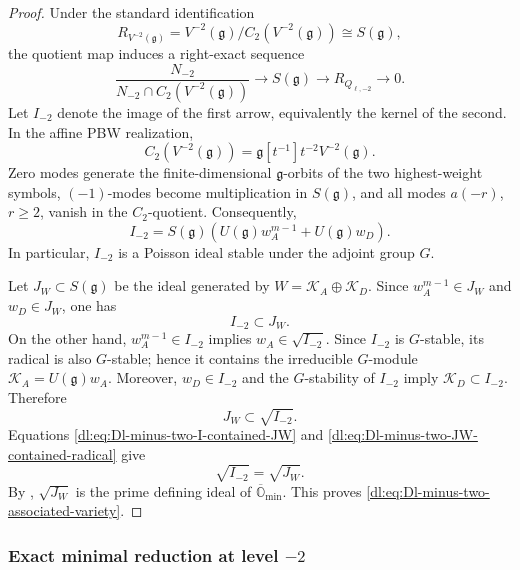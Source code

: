 \documentclass[11pt,reqno]{amsart}
\theoremstyle{definition}
\theoremstyle{remark}
\begin{document}
\begin{proof}
Under the standard identification
\[
  R_{V^{-2}(\mathfrak g)}
  =
  V^{-2}(\mathfrak g)/C_2(V^{-2}(\mathfrak g))
  \cong S(\mathfrak g),
\]
the quotient map induces a right-exact sequence
\begin{equation*}
  \frac{N_{-2}}
  {N_{-2}\cap C_2(V^{-2}(\mathfrak g))}
  \longrightarrow
  S(\mathfrak g)
  \longrightarrow
  R_{Q_{\ell,-2}}
  \longrightarrow0.
\end{equation*}
Let \(I_{-2}\) denote the image of the first arrow, equivalently the
kernel of the second.  In the affine PBW realization,
\[
  C_2(V^{-2}(\mathfrak g))
  =
  \mathfrak g[t^{-1}]t^{-2}V^{-2}(\mathfrak g).
\]
Zero modes generate the finite-dimensional \(\mathfrak g\)-orbits of
the two highest-weight symbols, \((-1)\)-modes become multiplication
in \(S(\mathfrak g)\), and all modes \(a(-r)\), \(r\ge2\), vanish in
the \(C_2\)-quotient.  Consequently,
\begin{equation*}
  I_{-2}
  =
  S(\mathfrak g)
  \left(
    U(\mathfrak g)w_A^{m-1}
    +
    U(\mathfrak g)w_D
  \right).
\end{equation*}
In particular, \(I_{-2}\) is a Poisson ideal stable under the adjoint
group \(G\).

Let \(J_W\subset S(\mathfrak g)\) be the ideal generated by
\(W=\mathcal K_A\oplus\mathcal K_D\).  Since
\(w_A^{m-1}\in J_W\) and \(w_D\in J_W\), one has
\begin{equation}
  I_{-2}\subset J_W.
  \label{dl:eq:Dl-minus-two-I-contained-JW}
\end{equation}
On the other hand, \(w_A^{m-1}\in I_{-2}\) implies
\(w_A\in\sqrt{I_{-2}}\).  Since \(I_{-2}\) is \(G\)-stable, its
radical is also \(G\)-stable; hence it contains the irreducible
\(G\)-module \(\mathcal K_A=U(\mathfrak g)w_A\).  Moreover,
\(w_D\in I_{-2}\) and the \(G\)-stability of \(I_{-2}\) imply
\(\mathcal K_D\subset I_{-2}\).  Therefore
\begin{equation}
  J_W\subset\sqrt{I_{-2}}.
  \label{dl:eq:Dl-minus-two-JW-contained-radical}
\end{equation}
Equations
\eqref{dl:eq:Dl-minus-two-I-contained-JW} and
\eqref{dl:eq:Dl-minus-two-JW-contained-radical} give
\[
  \sqrt{I_{-2}}=\sqrt{J_W}.
\]
By \cite[Lemma~2.1]{ArakawaMoreau2018},
\(\sqrt{J_W}\) is the prime defining ideal of
\(\overline{\mathbb O}_{\min}\).  This proves
\eqref{dl:eq:Dl-minus-two-associated-variety}.
\end{proof}

\subsubsection{Exact minimal reduction at level \(-2\)}
\end{document}
